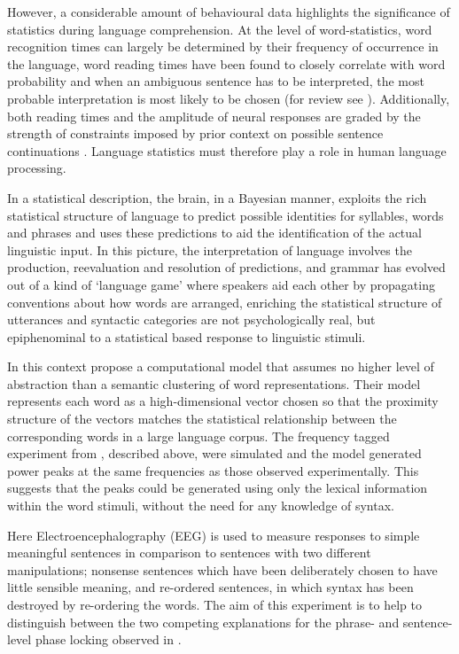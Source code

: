 \documentclass[10pt,letterpaper]{article}
\begin{document}
However, a considerable amount of behavioural data highlights the
significance of statistics during language comprehension. At the level
of word-statistics, word recognition times can largely be determined
by their frequency of occurrence in the language, word reading times
have been found to closely correlate with word probability and when an
ambiguous sentence has to be interpreted, the most probable
interpretation is most likely to be chosen (for review see
\cite{Jurafsky2002}). Additionally, both reading times and the
amplitude of neural responses are graded by the strength of
constraints imposed by prior context on possible sentence
continuations \cite{GibsonPearlmutter1998}. Language statistics must
therefore play a role in human language processing. 


In a statistical description, the brain, in a
Bayesian manner, exploits the rich statistical structure of language
to predict possible identities for syllables, words and phrases and
uses these predictions to aid the identification of the actual
linguistic input. In this picture, the interpretation of language
involves the production, reevaluation and resolution of predictions,
and grammar has evolved out of a kind of \lq{}language game\rq{} where
speakers aid each other by propagating conventions about how words are
arranged, enriching the statistical structure of utterances and syntactic categories are not psychologically real, but epiphenominal to a statistical based response to linguistic
stimuli.

In this context \cite{FrankYang2018} propose a computational model that
assumes no higher level of abstraction than a semantic
clustering of word representations. Their model represents each word
as a high-dimensional vector chosen so that the proximity structure of
the vectors matches the statistical relationship between the
corresponding words in a large language corpus. The frequency tagged
experiment from \cite{DingEtAl2016}, described above, were simulated
and the model generated power peaks at the same frequencies as those
observed experimentally. This suggests that the peaks could be
generated using only the lexical information within the word stimuli,
without the need for any knowledge of syntax. 

Here Electroencephalography (EEG) is used to measure responses to
simple meaningful sentences in comparison to sentences with two different
manipulations; nonsense sentences which have been deliberately chosen
to have little sensible meaning, and re-ordered sentences, in which
syntax has been destroyed by re-ordering the words. The aim of this
experiment is to help to distinguish between the two competing
explanations for the phrase- and sentence-level phase locking observed
in \cite{DingEtAl2016,DingEtAl2017}.
\end{document}
